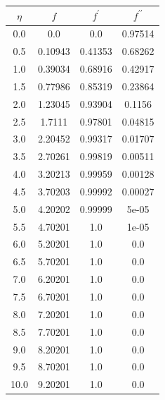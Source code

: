 \begin{table}
{\begin{tabular}{|c|c|c|c|}
            \hline
            $\eta$ & $f$ & $f^\prime$ & $f^{\prime\prime}$ \\ \hline
            0.0 & 0.0 & 0.0 & 0.97514 \\ \hline
            0.5 & 0.10943 & 0.41353 & 0.68262 \\ \hline
            1.0 & 0.39034 & 0.68916 & 0.42917 \\ \hline
            1.5 & 0.77986 & 0.85319 & 0.23864 \\ \hline
            2.0 & 1.23045 & 0.93904 & 0.1156 \\ \hline
            2.5 & 1.7111 & 0.97801 & 0.04815 \\ \hline
            3.0 & 2.20452 & 0.99317 & 0.01707 \\ \hline
            3.5 & 2.70261 & 0.99819 & 0.00511 \\ \hline
            4.0 & 3.20213 & 0.99959 & 0.00128 \\ \hline
            4.5 & 3.70203 & 0.99992 & 0.00027 \\ \hline
            5.0 & 4.20202 & 0.99999 & 5e-05 \\ \hline
            5.5 & 4.70201 & 1.0 & 1e-05 \\ \hline
            6.0 & 5.20201 & 1.0 & 0.0 \\ \hline
            6.5 & 5.70201 & 1.0 & 0.0 \\ \hline
            7.0 & 6.20201 & 1.0 & 0.0 \\ \hline
            7.5 & 6.70201 & 1.0 & 0.0 \\ \hline
            8.0 & 7.20201 & 1.0 & 0.0 \\ \hline
            8.5 & 7.70201 & 1.0 & 0.0 \\ \hline
            9.0 & 8.20201 & 1.0 & 0.0 \\ \hline
            9.5 & 8.70201 & 1.0 & 0.0 \\ \hline
            10.0 & 9.20201 & 1.0 & 0.0 \\ \hline
        \end{tabular}
        \label{table_m4}
    }
\end{table}

